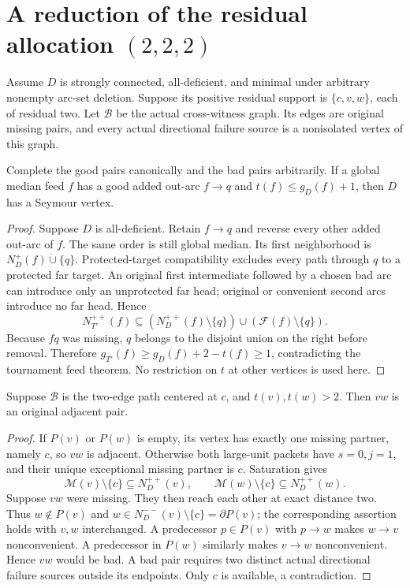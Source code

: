 \section{A reduction of the residual allocation $(2,2,2)$}
\label{sec:two-two-two-path-reduction}

Assume $D$ is strongly connected, all-deficient, and minimal under
arbitrary nonempty arc-set deletion. Suppose its positive residual
support is $\{c,v,w\}$, each of residual two. Let $\mathcal B$
be the actual cross-witness graph. Its edges are original missing
pairs, and every actual directional failure source is a nonisolated
vertex of this graph.

\begin{lemma}
\label{lem:eta222-retain-good}
Complete the good pairs canonically and the bad pairs arbitrarily.
If a global median feed $f$ has a good added out-arc $f\to q$
and $t(f)\le g_D(f)+1$, then $D$ has a Seymour vertex.
\end{lemma}

\begin{proof}
Suppose $D$ is all-deficient. Retain $f\to q$ and reverse every
other added out-arc of $f$. The same order is still global median.
Its first neighborhood is $N_D^+(f)\dot\cup\{q\}$.
Protected-target compatibility excludes every path through $q$
to a protected far target. An original first intermediate followed
by a chosen bad arc can introduce only an unprotected far head;
original or convenient second arcs introduce no far head. Hence
\[
 N_{T'}^{++}(f)\subseteq
 (N_D^{++}(f)\setminus\{q\})
 \cup(\mathcal F(f)\setminus\{q\}).
\]
Because $fq$ was missing, $q$ belongs to the disjoint union on the
right before removal. Therefore
$g_{T'}(f)\ge g_D(f)+2-t(f)\ge1$, contradicting the tournament
feed theorem.
No restriction on $t$ at other vertices is used here.
\end{proof}

\begin{lemma}
\label{lem:eta222-large-leaves-adjacent}
Suppose $\mathcal B$ is the two-edge path centered at $c$, and
$t(v),t(w)>2$. Then $vw$ is an original adjacent pair.
\end{lemma}

\begin{proof}
If $P(v)$ or $P(w)$ is empty, its vertex has exactly one missing
partner, namely $c$, so $vw$ is adjacent.
Otherwise both large-unit packets have $s=0,j=1$, and their unique
exceptional missing partner is $c$. Saturation gives
\[
 \mathcal M(v)\setminus\{c\}\subseteq N_D^{++}(v),\qquad
 \mathcal M(w)\setminus\{c\}\subseteq N_D^{++}(w).
\]
Suppose $vw$ were missing. They then reach each other at exact
distance two. Thus $w\notin P(v)$ and
$w\in N_D^{--}(v)\setminus\{c\}=\partial P(v)$;
the corresponding assertion holds with $v,w$ interchanged.
A predecessor $p\in P(v)$ with $p\to w$ makes $w\to v$
nonconvenient. A predecessor in $P(w)$ similarly makes $v\to w$
nonconvenient. Hence $vw$ would be bad. A bad pair requires two
distinct actual directional failure sources outside its endpoints.
Only $c$ is available, a contradiction.
\end{proof}

